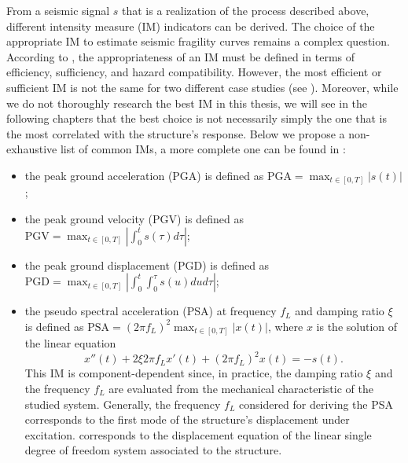 From a seismic signal $s$ that is a realization of the process described above, different intensity measure (IM) indicators can be derived.
The choice of the appropriate IM to estimate seismic fragility curves
remains a complex question. 
According to \citet{giovenale_comparing_2004}, the appropriateness of an IM must be defined in terms of efficiency, sufficiency, and hazard compatibility.
However, the most efficient or sufficient IM is not the same for two different case studies (see \cite{mackie_probabilistic_2001,hariri-ardebili_probabilistic_2016}). %
Moreover, while we do not  thoroughly research the best IM in this thesis, we will see in the following chapters that the best choice is not necessarily simply the one that is the most correlated with the structure's response.
Below we propose a non-exhaustive list of common IMs, a more complete one can be found in \cite{luco_structure-specific_2007}:
    \begin{itemize}
        \item the peak ground acceleration (PGA) is defined as $\text{PGA}=\max_{t\in[0,T]}|s(t)|$;
        \item the peak ground velocity (PGV) is defined as $\text{PGV}=\max_{t\in[0,T]}\left|\int_0^ts(\tau)d\tau \right|$;
        \item the peak ground displacement (PGD) is defined as $\text{PGD}=\max_{t\in[0,T]}\left|\int_{0}^{t}\int_{0}^{\tau}s(u)dud\tau\right|$;
        \item the pseudo spectral acceleration (PSA) at frequency $f_L$ and damping ratio $\xi$ is defined as $\text{PSA}=(2\pi f_L)^2\max_{t\in[0,T]}|x(t)|$, where $x$ is the solution of the linear equation
        \begin{equation}\label{eq:intro-frag:ALS}
            x''(t) + 2\xi2\pi f_Lx'(t)+(2\pi f_L)^2x(t) = -s(t).
        \end{equation}
        This IM is component-dependent since, in practice, the damping ratio $\xi$ and the frequency $f_L$ are evaluated from the mechanical characteristic of the studied system. Generally, the frequency $f_L$ considered for deriving the PSA corresponds to the first mode of the structure's displacement under excitation.  corresponds to the displacement equation of the linear single degree of freedom system associated to the structure.
    \end{itemize}

